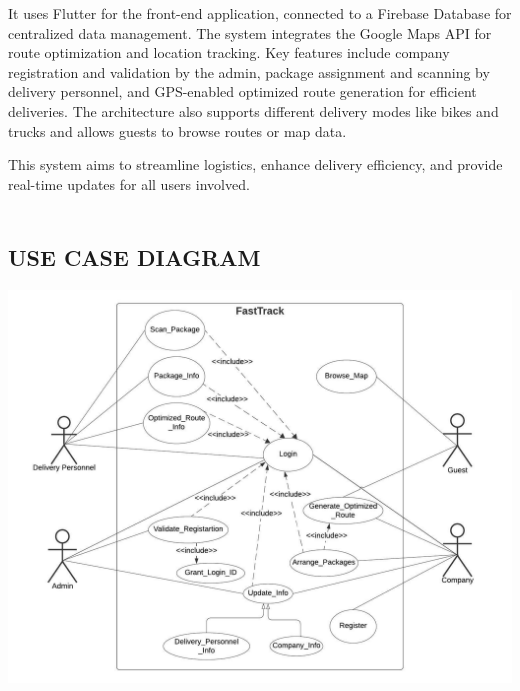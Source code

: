 \documentclass{article}
\begin{document}
It uses Flutter for the front-end application, connected to a Firebase Database for centralized data management. The system integrates the Google Maps API for route optimization and location tracking. Key features include company registration and validation by the admin, package assignment and scanning by delivery personnel, and GPS-enabled optimized route generation for efficient deliveries. The architecture also supports different delivery modes like bikes and trucks and allows guests to browse routes or map data.

This system aims to streamline logistics, enhance delivery efficiency, and provide real-time updates for all users involved.
\\\
\newpage

\subsection{USE CASE DIAGRAM}
\vspace{3cm}
\includegraphics[scale=0.75]{Use case diagram.jpeg}
\newpage
\end{document}

